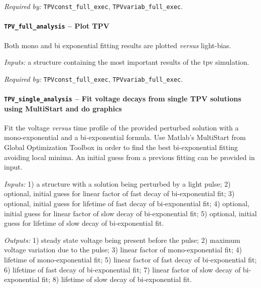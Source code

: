 		\textit{Required by:} \texttt{TPV\-const\_full\_exec}, \texttt{TPV\-variab\_full\_exec}.
		
		

		
		
		\paragraph{\texttt{TPV\_full\_analysis} -- Plot TPV}
			Both mono and bi exponential fitting results are plotted \textsl{versus} light-bias.
			
				\textit{Inputs:} a structure containing the most important results of the \gls{tpv} simulation.
		
		
		
		\textit{Required by:} \texttt{TPV\-const\_full\_exec}, \texttt{TPV\-variab\_full\_exec}.
		
		\paragraph{\texttt{TPV\_single\_analysis} -- Fit voltage decays from single TPV solutions using MultiStart and do graphics}
		Fit the voltage \textsl{versus} time profile of the provided perturbed solution with a mono\hyp{}exponential and a bi\hyp{}exponential formula.
		Use Matlab's MultiStart from Global Optimization Toolbox in order to find the best bi\hyp{}exponential fitting avoiding local minima.
		An initial guess from a previous fitting can be provided in input.
		
		\textit{Inputs:} 1) a structure with a solution being perturbed by a light pulse;
		2) optional, initial guess for linear factor of fast decay of bi-exponential fit;
		3) optional, initial guess for lifetime of fast decay of bi-exponential fit;
		4) optional, initial guess for linear factor of slow decay of bi-exponential fit;
		5) optional, initial guess for lifetime of slow decay of bi-exponential fit.
		
		\textit{Outputs:} 1) steady state voltage being present before the pulse;
		   2) maximum voltage variation due to the pulse;
		   3) linear factor of mono-exponential fit;
		   4) lifetime of mono-exponential fit;
		   5) linear factor of fast decay of bi-exponential fit;
		   6) lifetime of fast decay of bi-exponential fit;
		   7) linear factor of slow decay of bi-exponential fit;
		   8) lifetime of slow decay of bi-exponential fit.
		
